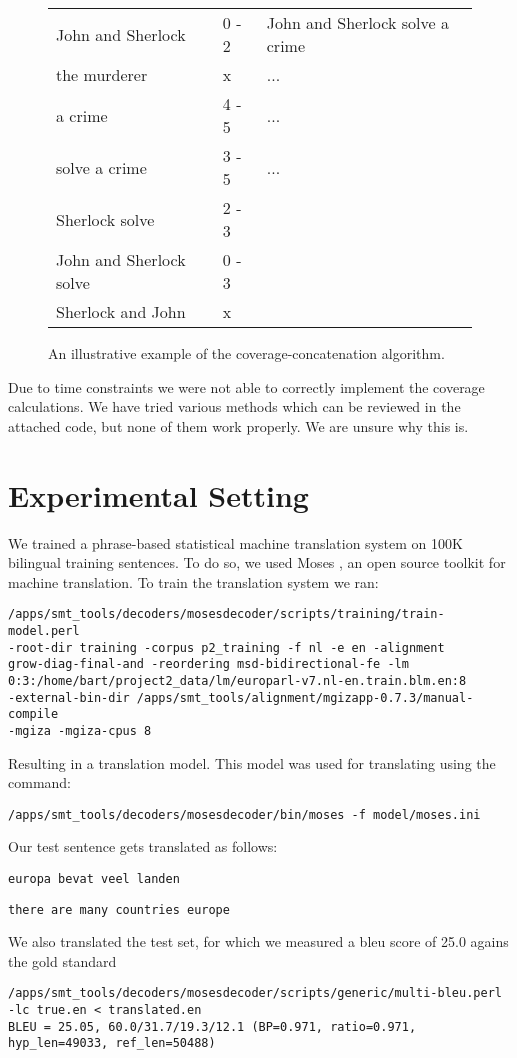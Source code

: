 \documentclass[11pt]{article}
\begin{document}
\begin{figure}
    \begin{tabular}{l|l|l}
    John and Sherlock       & 0 - 2 & John and Sherlock solve a crime \\
    the murderer            & x     & ...                             \\
    a crime                 & 4 - 5 & ...                             \\
    solve a crime           & 3 - 5 & ...                             \\
    Sherlock solve          & 2 - 3 & ~                               \\
    John and Sherlock solve & 0 - 3 & ~                               \\
    Sherlock and John       & x     & ~                               \\
    \end{tabular}
\caption{An illustrative example of the coverage-concatenation algorithm.}
    \label{algorithm}
\end{figure}

Due to time constraints we were not able to correctly implement the coverage calculations. We have tried various methods which can be reviewed in the attached code, but none of them work properly. We are unsure why this is.

\section{Experimental Setting}
\label{eval}
We trained a phrase-based statistical machine translation system on 100K bilingual training sentences. To do so, we used Moses \cite{moses}, an open source toolkit for machine translation. To train the translation system we ran: \begin{verbatim}/apps/smt_tools/decoders/mosesdecoder/scripts/training/train-model.perl 
-root-dir training -corpus p2_training -f nl -e en -alignment
grow-diag-final-and -reordering msd-bidirectional-fe -lm
0:3:/home/bart/project2_data/lm/europarl-v7.nl-en.train.blm.en:8
-external-bin-dir /apps/smt_tools/alignment/mgizapp-0.7.3/manual-compile
-mgiza -mgiza-cpus 8\end{verbatim} Resulting in a translation model. 
This model was used for translating using the command: \begin{verbatim}/apps/smt_tools/decoders/mosesdecoder/bin/moses -f model/moses.ini\end{verbatim} 
Our test sentence gets translated as follows:
\begin{verbatim}europa bevat veel landen\end{verbatim} 
\begin{verbatim}there are many countries europe\end{verbatim} 
We also translated the test set, for which we measured a bleu score of 25.0 agains the gold standard
\begin{verbatim}/apps/smt_tools/decoders/mosesdecoder/scripts/generic/multi-bleu.perl -lc true.en < translated.en
BLEU = 25.05, 60.0/31.7/19.3/12.1 (BP=0.971, ratio=0.971, hyp_len=49033, ref_len=50488)\end{verbatim} 
\end{document}
